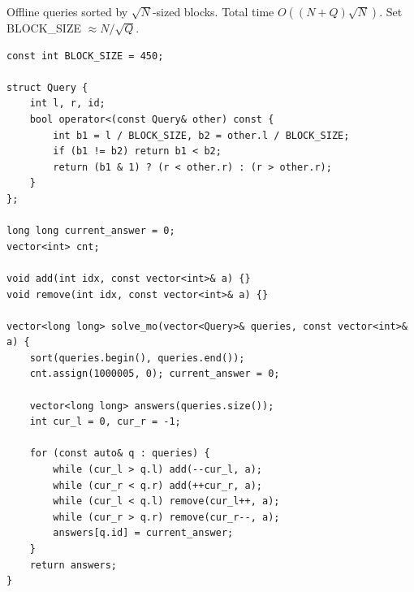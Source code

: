 
Offline queries sorted by $\sqrt{N}$-sized blocks. Total time $O((N + Q) \sqrt{N})$. Set BLOCK\_SIZE $\approx N / \sqrt{Q}$.

\begin{lstlisting}
const int BLOCK_SIZE = 450;

struct Query {
    int l, r, id;
    bool operator<(const Query& other) const {
        int b1 = l / BLOCK_SIZE, b2 = other.l / BLOCK_SIZE;
        if (b1 != b2) return b1 < b2;
        return (b1 & 1) ? (r < other.r) : (r > other.r);
    }
};

long long current_answer = 0;
vector<int> cnt;

void add(int idx, const vector<int>& a) {}
void remove(int idx, const vector<int>& a) {}

vector<long long> solve_mo(vector<Query>& queries, const vector<int>& a) {
    sort(queries.begin(), queries.end());
    cnt.assign(1000005, 0); current_answer = 0;
    
    vector<long long> answers(queries.size());
    int cur_l = 0, cur_r = -1;

    for (const auto& q : queries) {
        while (cur_l > q.l) add(--cur_l, a);
        while (cur_r < q.r) add(++cur_r, a);
        while (cur_l < q.l) remove(cur_l++, a);
        while (cur_r > q.r) remove(cur_r--, a);
        answers[q.id] = current_answer;
    }
    return answers;
}
\end{lstlisting}
